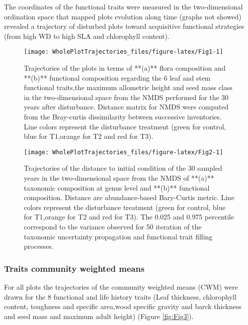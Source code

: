 \documentclass[fleqn,10pt]{ArtEcoFoG} %
\theoremstyle{definition}
\theoremstyle{definition}
\theoremstyle{definition}
\theoremstyle{remark}
\begin{document}
The coordinates of the functional traits were measured in the
two-dimensional ordination space that mapped plots evolution along time
(graphs not showed) revealed a trajectory of disturbed plots toward
acquisitive functional strategies (from high WD to high SLA and
chlorophyll content).

\begin{figure*}

{\centering \texttt{[image: WholePlotTrajectories\_files/figure-latex/Fig1-1]} 

}

\caption{Trajectories of the plots in terms of **(a)** flora composition and **(b)** functional composition regarding the 6 leaf and stem functional traits,the maximum allometric height and seed mass class in the two-dimensional space from the NMDS performed for the 30 years after disturbance. Distance matrix for NMDS were computed from the Bray-curtis dissimilarity between successive inventories. Line colors represent the disturbance treatment (green for control, blue for T1,orange for T2 and red for T3).}\label{fig:Fig1}
\end{figure*}

\begin{figure}

{\centering \texttt{[image: WholePlotTrajectories\_files/figure-latex/Fig2-1]} 

}

\caption{Trajectories of the distance to initial condition of the 30 sampled years in the two-dimensional space from the NMDS of **(a)** taxonomic composition at genus level and **(b)** functional composition. Distance are abundance-based Bary-Curtis metric. Line colors represent the disturbance treatment (green for control, blue for T1,orange for T2 and red for T3). The 0.025 and 0.975 percentile correspond to the variance observed for 50 iteration of the taxonomic uncertainty propagation and functional trait filling processes. }\label{fig:Fig2}
\end{figure}

\subsubsection{Traits community weighted
means}\label{traits-community-weighted-means}

For all plots the trajectories of the community weighted means (CWM)
were drawn for the 8 functional and life history traits (Leaf thickness,
chlorophyll content, toughness and specific area,wood specific gravity
and barck thickness and seed mass and maximum adult height) (Figure
\ref{fig:Fig3}).
\end{document}
